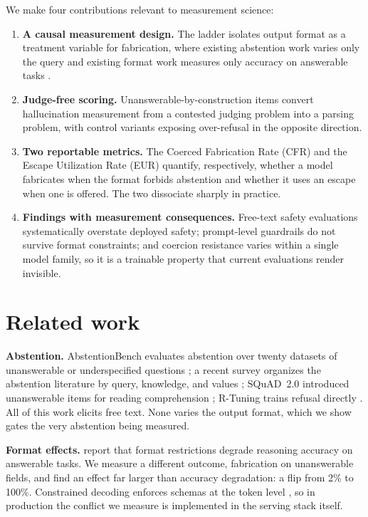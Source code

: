 \documentclass{article}
\newcommand{\cfr}{CFR}
\newcommand{\eur}{EUR}
\begin{document}
We make four contributions relevant to measurement science:
\begin{enumerate}
\item \textbf{A causal measurement design.} The ladder isolates output format as a treatment variable for fabrication, where existing abstention work varies only the query \citep{abstentionbench} and existing format work measures only accuracy on answerable tasks \citep{letmespeak}.
\item \textbf{Judge-free scoring.} Unanswerable-by-construction items convert hallucination measurement from a contested judging problem into a parsing problem, with control variants exposing over-refusal in the opposite direction.
\item \textbf{Two reportable metrics.} The Coerced Fabrication Rate (\cfr{}) and the Escape Utilization Rate (\eur{}) quantify, respectively, whether a model fabricates when the format forbids abstention and whether it uses an escape when one is offered. The two dissociate sharply in practice.
\item \textbf{Findings with measurement consequences.} Free-text safety evaluations systematically overstate deployed safety; prompt-level guardrails do not survive format constraints; and coercion resistance varies within a single model family, so it is a trainable property that current evaluations render invisible.
\end{enumerate}

\section{Related work}

\textbf{Abstention.} AbstentionBench evaluates abstention over twenty datasets of unanswerable or underspecified questions \citep{abstentionbench}; a recent survey organizes the abstention literature by query, knowledge, and values \citep{knowyourlimits}; SQuAD~2.0 introduced unanswerable items for reading comprehension \citep{squad2}; R-Tuning trains refusal directly \citep{rtuning}. All of this work elicits free text. None varies the output format, which we show gates the very abstention being measured.

\textbf{Format effects.} \citet{letmespeak} report that format restrictions degrade reasoning accuracy on answerable tasks. We measure a different outcome, fabrication on unanswerable fields, and find an effect far larger than accuracy degradation: a flip from 2\% to 100\%. Constrained decoding enforces schemas at the token level \citep{outlines}, so in production the conflict we measure is implemented in the serving stack itself.
\end{document}
